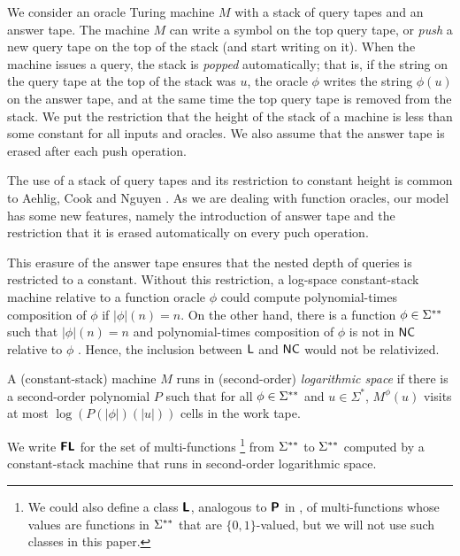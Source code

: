 \documentclass[envcountsame,orivec,oribibl]{llncs}
\begin{document}
We consider an oracle Turing machine $M$ 
with a stack of query tapes and an answer tape.
The machine $M$ can write a symbol on the top query tape, or 
\emph{push} a new query tape on the top of the stack (and start writing on it).
When the machine issues a query, the stack is \emph{popped} automatically; 
that is, 
if the string on the query tape at the top of the stack was $u$, 
the oracle $\phi$ writes the string $\phi (u)$ on the answer tape, 
and at the same time the top query tape is removed from the stack. 
We put the restriction that the height of the stack of a machine is less than 
some constant for all inputs and oracles.
We also assume that 
the answer tape is erased after each push operation.

The use of a stack of query tapes and its restriction to constant height 
is common to Aehlig, Cook and Nguyen \cite{aehlig2007relativizing}. 
As we are dealing with function oracles, 
our model has some new features, namely 
the introduction of answer tape and 
the restriction that it is erased automatically on every puch operation. 

This erasure of the answer tape
ensures that the nested depth of queries is restricted to a constant.
Without this restriction, a log-space constant-stack machine relative to 
a function oracle $\phi$ could compute polynomial-times composition
of $\phi$ if $|\phi|(n) = n$.
On the other hand, there is a function $\phi \in \Sigma ^{**}$ such that $|\phi|(n) = n$
and polynomial-times composition of $\phi$ is not in $\mathsf{NC}$ relative to $\phi$ \cite{aehlig2007relativizing}.
Hence, the inclusion between $\mathsf{L}$ and $\mathsf{NC}$ would not be relativized.



\begin{definition}
 A (constant-stack) machine $M$ runs in (second-order) \emph{logarithmic space}
 if there is a second-order polynomial $P$ such that for all $\phi \in \Sigma ^{**}$
 and $u \in \Sigma^*$, $M^\phi(u)$ visits at most $\log(P(|\phi|)(|u|))$ cells
 in the work tape.
\end{definition}

\begin{definition}
 We write $\text{\bfseries \sffamily \upshape FL}$ for the set of multi-functions%
\footnote{%
We could also define a class $\text{\bfseries \sffamily \upshape L}$, 
analogous to $\text{\bfseries \sffamily \upshape P}$ in \cite{kawamura2012complexity}, 
of multi-functions whose values are functions in $\Sigma ^{**}$ 
that are $\{0, 1\}$-valued, 
but we will not use such classes in this paper. 
}
 from $\Sigma ^{**}$ to $\Sigma ^{**}$ 
 computed by a constant-stack machine that runs in second-order logarithmic space.
\end{definition}
\end{document}
